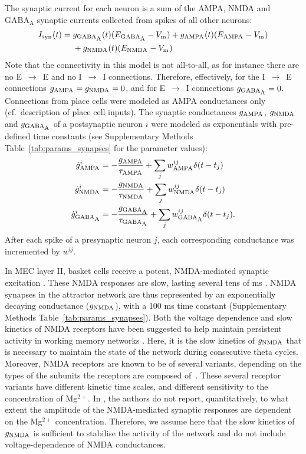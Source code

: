 \documentclass[a4paper,12pt]{article}
\newcommand{\ssc}[3]{\ensuremath{#1_{\text{#2}_{\text{#3}}}}}
\newcommand{\Vm}       {\ssc{V}      {m}     {}}
\newcommand{\Isyn}     {\ssc{I}      {syn}   {}}
\newcommand{\gGABAA}   {\ssc{g}      {\scriptsize{GABA}}{\scriptsize{A}}}
\newcommand{\EGABAA}   {\ssc{E}      {\scriptsize{GABA}}{\scriptsize{A}}}
\newcommand{\tauGABAA} {\ssc{\tau}   {\scriptsize{GABA}}{\scriptsize{A}}}
\newcommand{\gAMPA}    {\ssc{g}      {\scriptsize{AMPA}}{}}
\newcommand{\EAMPA}    {\ssc{E}      {\scriptsize{AMPA}}{}}
\newcommand{\tauAMPA}  {\ssc{\tau}   {\scriptsize{AMPA}}{}}
\newcommand{\gNMDA}    {\ssc{g}      {\scriptsize{NMDA}}{}}
\newcommand{\ENMDA}    {\ssc{E}      {\scriptsize{NMDA}}{}}
\newcommand{\tauNMDA}  {\ssc{\tau}   {\scriptsize{NMDA}}{}}
\newcommand{\dgAMPA} {\ssc{\dot{g}}{\scriptsize{AMPA}}{}}
\newcommand{\dgGABAA}{\ssc{\dot{g}}{\scriptsize{GABA}}{\scriptsize{A}}}
\newcommand{\dgNMDA} {\ssc{\dot{g}}{\scriptsize{NMDA}}{}}
\newcommand{\wAMPA   }{\ssc{w}      {\scriptsize{AMPA}}{}}
\newcommand{\wNMDA   }{\ssc{w}      {\scriptsize{NMDA}}{}}
\newcommand{\wGABAA  }{\ssc{w}      {\scriptsize{GABA}}{\scriptsize{A}}}
\begin{document}
The synaptic current for each neuron is a sum of the AMPA, NMDA and
$\text{GABA}_{\text{A}}$ synaptic currents collected from spikes of all other
neurons:
\begin{align}
    \Isyn(t)  = {} & \gGABAA(t) (\EGABAA - \Vm) + \gAMPA(t) (\EAMPA - \Vm) \notag \\
                & + \gNMDA(t) (\ENMDA - \Vm)
    \label{eq:I_syn}
\end{align}               
Note that the connectivity in this model is not all-to-all, as for instance
there are no E~$\rightarrow$~E and no I~$\rightarrow$~I connections. Therefore,
effectively, for the I~$\rightarrow$~E connections $\gAMPA = \gNMDA = 0$, and
for E~$\rightarrow$~I connections $\gGABAA = 0$. 
Connections from place cells
were modeled as AMPA conductances only (cf.\ description of place cell inputs).
The synaptic conductances $\gAMPA$, $\gNMDA$ and $\gGABAA$ of a postsynaptic
neuron $i$ were modeled as exponentials with pre-defined time constants (see
Supplementary Methods Table~\ref{tab:params_synapses} for the parameter values):
\begin{align}
    \dgAMPA^i  &=  -\frac{\gAMPA }{\tauAMPA}  + \sum_j \wAMPA^{ij}  \delta(t - t_j)\notag  \\
    \dgNMDA^i  &=  -\frac{\gNMDA }{\tauNMDA}  + \sum_j \wNMDA^{ij}  \delta(t - t_j)\notag  \\
    \dgGABAA^i &=  -\frac{\gGABAA}{\tauGABAA} + \sum_j \wGABAA^{ij} \delta(t - t_j).
    \label{eq:dgSyn}
\end{align}
After each spike of a presynaptic neuron $j$, each corresponding conductance
was incremented by $w^{ij}$.

In MEC layer II, basket cells receive a potent, NMDA-mediated synaptic
excitation \citep{JONES:1993je}. These NMDA responses are slow, lasting several
tens of ms \citep{JONES:1993je}. NMDA synapses in the attractor network are thus
represented by an exponentially decaying conductance ($\gNMDA$), with a 100 ms
time constant (Supplementary Methods Table~\ref{tab:params_synapses}).
Both the voltage dependence and slow kinetics of NMDA receptors have been
suggested to help maintain persistent activity in working memory networks
\citep{Wang:1999wt}.  Here, it is the slow kinetics of $\gNMDA$ that is
necessary to maintain the state of the network during consecutive theta cycles.
Moreover, NMDA receptors are known to be of several variants, depending on the
types of the subunits the receptors are composed of~\citep{Paoletti:2013ht}.
These several receptor variants have different kinetic time scales, and
different sensitivity to the concentration of Mg$^{2+}$. In
\citep{JONES:1993je}, the authors
do not report, quantitatively, to what extent the amplitude of the
NMDA-mediated synaptic responses are dependent on the Mg$^{2+}$ concentration.
Therefore, we assume here that the slow kinetics of $\gNMDA$ is sufficient to
stabilise the activity of the network and do not include voltage-dependence of
NMDA conductances.
\end{document}
